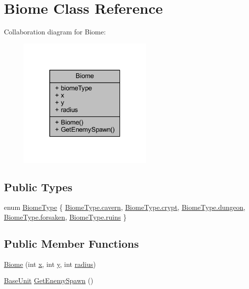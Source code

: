 \hypertarget{class_biome}{}\section{Biome Class Reference}
\label{class_biome}


Collaboration diagram for Biome\+:\nopagebreak
\begin{figure}[H]
\begin{center}
\leavevmode
\includegraphics[width=187pt]{class_biome__coll__graph}
\end{center}
\end{figure}
\subsection*{Public Types}
\begin{DoxyCompactItemize}
\item 
enum \mbox{\hyperlink{class_biome_a7ddcfcc6d4e88c5eb73df6827df862da}{Biome\+Type}} \{ \newline
\mbox{\hyperlink{class_biome_a7ddcfcc6d4e88c5eb73df6827df862daa420041ed55a01779d7c409d007070961}{Biome\+Type.\+cavern}}, 
\mbox{\hyperlink{class_biome_a7ddcfcc6d4e88c5eb73df6827df862daaf7bd616b6c841d2538735f76d1e02b57}{Biome\+Type.\+crypt}}, 
\mbox{\hyperlink{class_biome_a7ddcfcc6d4e88c5eb73df6827df862daae0dc3209a149c3ae58feb149aef7cf3d}{Biome\+Type.\+dungeon}}, 
\mbox{\hyperlink{class_biome_a7ddcfcc6d4e88c5eb73df6827df862daa035c88a67814485689ec861c3685c316}{Biome\+Type.\+forsaken}}, 
\newline
\mbox{\hyperlink{class_biome_a7ddcfcc6d4e88c5eb73df6827df862daad5472cde0923fa02dce57c6a1bc9985c}{Biome\+Type.\+ruins}}
 \}
\end{DoxyCompactItemize}
\subsection*{Public Member Functions}
\begin{DoxyCompactItemize}
\item 
\mbox{\hyperlink{class_biome_a0c6561c6514566b5170802d7699e761a}{Biome}} (int \mbox{\hyperlink{class_biome_ae63d1400ef2eaa0c520bec593aa2e90d}{x}}, int \mbox{\hyperlink{class_biome_a3793ddae113d9c2b545a2dc7c6b96f3a}{y}}, int \mbox{\hyperlink{class_biome_a71b951bc82d85f930f9c6135a79a2bbc}{radius}})
\item 
\mbox{\hyperlink{class_base_unit}{Base\+Unit}} \mbox{\hyperlink{class_biome_abfb2b6d9c6ae23d0d7f247e10b568a9e}{Get\+Enemy\+Spawn}} ()
\end{DoxyCompactItemize}
